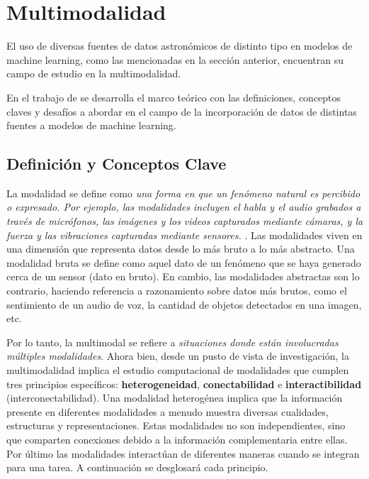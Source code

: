 \documentclass[../tesis.tex]{subfiles}
\begin{document}
\section{Multimodalidad} \label{introduction:multimodality}
El uso de diversas fuentes de datos astronómicos de distinto tipo en modelos de machine learning, como las mencionadas en la sección anterior, encuentran su campo de estudio en la multimodalidad.\par\null\par

En el trabajo de \cite{multimodality} se desarrolla el marco teórico con las definiciones, conceptos claves y desafíos a abordar en el campo de la incorporación de datos de distintas fuentes a modelos de machine learning.\par\null\par

\subsection{Definición y Conceptos Clave}

La modalidad se define como \textit{una forma en que un fenómeno natural es percibido o expresado. Por ejemplo, las modalidades incluyen el habla y el audio grabados a través de micrófonos, las imágenes y los videos capturados mediante cámaras, y la fuerza y las vibraciones capturadas mediante sensores.} \cite{multimodality}. Las modalidades viven en una dimensión que representa datos desde lo más bruto a lo más abstracto. Una modalidad bruta se define como aquel dato de un fenómeno que se haya generado cerca de un sensor (dato en bruto). En cambio, las modalidades abstractas son lo contrario, haciendo referencia a razonamiento sobre datos más brutos, como el sentimiento de un audio de voz, la cantidad de objetos detectados en una imagen, etc.\par\null\par

Por lo tanto, la multimodal se refiere a \textit{situaciones donde están involucradas múltiples modalidades}. Ahora bien, desde un pusto de vista de investigación, la multimodalidad implica el estudio computacional de modalidades que cumplen tres principios específicos: \textbf{heterogeneidad}, \textbf{conectabilidad} e \textbf{interactibilidad} (interconectabilidad). Una modalidad heterogénea implica que la información presente en diferentes modalidades a menudo muestra diversas cualidades, estructuras y representaciones. Estas modalidades no son independientes, sino que comparten conexiones debido a la información complementaria entre ellas. Por último las modalidades interactúan de diferentes maneras cuando se integran para una tarea. A continuación se desglosará cada principio.\par\null\par
\end{document}
